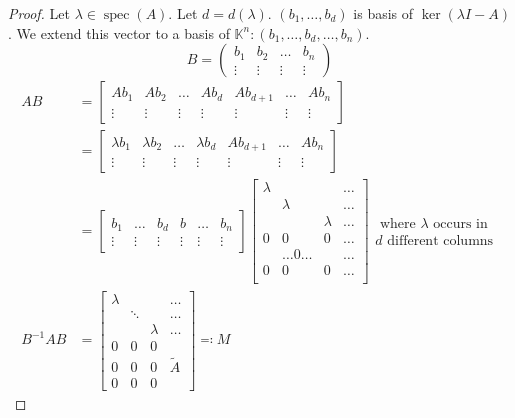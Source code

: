 \documentclass{article}
\begin{document}
\begin{proof}
  Let $\lambda \in \operatorname{spec}(A)$. Let $d = d(\lambda)$. $(b_1, \dots, b_d)$ is basis of $\ker(\lambda I - A)$.
  We extend this vector to a basis of $\mathbb K^n:  (b_1, \dots, b_d, \dots, b_n)$.
  \[ B = \begin{pmatrix} b_1 & b_2 & \dots & b_n \\ \vdots & \vdots & \vdots & \vdots \end{pmatrix} \]
  \begin{align*}
    AB &= \begin{bmatrix} Ab_1 & Ab_2 & \dots & Ab_d & Ab_{d+1} & \dots & Ab_n \\ \vdots & \vdots & \vdots & \vdots & \vdots & \vdots & \vdots \end{bmatrix} \\
       &= \begin{bmatrix} \lambda b_1 & \lambda b_2 & \dots & \lambda b_d & Ab_{d+1} & \dots & Ab_n \\ \vdots & \vdots & \vdots & \vdots & \vdots & \vdots & \vdots \end{bmatrix} \\
	       &= \begin{bmatrix} b_1 & \dots & b_d & b & \dots & b_n \\ \vdots & \vdots & \vdots & \vdots & \vdots & \vdots \end{bmatrix} \begin{bmatrix} \lambda & & & \dots \\ & \lambda & & \dots \\ & & \lambda & \dots \\ 0 & 0 & 0 & \dots \\   & \dots 0 \dots &   & \dots \\ 0 & 0 & 0 & \dots \\ \end{bmatrix} \substack{\text{ where $\lambda$ occurs in} \\ \text{$d$ different columns}} \\
    B^{-1}AB &= \begin{bmatrix} \lambda & & & \dots \\ & \ddots & & \dots \\ & & \lambda & \dots \\ 0 & 0 & 0 & \\ 0 & 0 & 0 & \tilde A \\ 0 & 0 & 0 & \end{bmatrix} \eqqcolon M
  \end{align*}


\end{proof}
\end{document}
